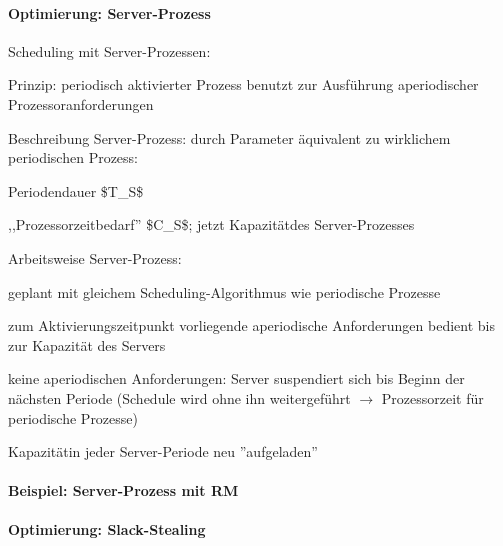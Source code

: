 \documentclass[a4paper]{article}
\begin{document}
\begin{multicols}{3}
    \paragraph{Optimierung:
        Server-Prozess}

    \begin{itemize*}
        \item
        Scheduling mit Server-Prozessen:
        \begin{itemize*}
            \item Prinzip: periodisch aktivierter Prozess benutzt zur Ausführung aperiodischer Prozessoranforderungen
            \item Beschreibung Server-Prozess: durch Parameter äquivalent zu wirklichem periodischen Prozess: \begin{itemize*} \item Periodendauer \$T\_S\$ \item ,,Prozessorzeitbedarf'' \$C\_S\$; jetzt Kapazitätdes Server-Prozesses \end{itemize*}
            \item Arbeitsweise Server-Prozess: \begin{itemize*} \item geplant mit gleichem Scheduling-Algorithmus wie periodische Prozesse \item zum Aktivierungszeitpunkt vorliegende aperiodische Anforderungen bedient bis zur Kapazität des Servers \item keine aperiodischen Anforderungen: Server suspendiert sich bis Beginn der nächsten Periode (Schedule wird ohne ihn weitergeführt $\rightarrow$ Prozessorzeit für periodische Prozesse) \item Kapazitätin jeder Server-Periode neu ''aufgeladen'' \end{itemize*}
        \end{itemize*}
    \end{itemize*}


    \paragraph{Beispiel: Server-Prozess mit
        RM}



    \paragraph{Optimierung:
        Slack-Stealing}


\end{multicols}
\end{document}
